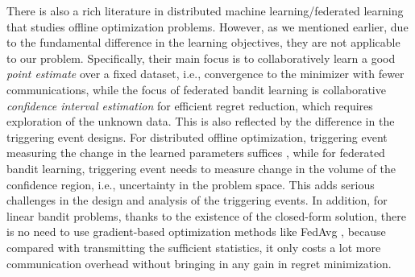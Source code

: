 There is also a rich literature in distributed machine learning/federated learning \citep{mcmahan2017communication,li2019convergence} that studies offline optimization problems. However, as we mentioned earlier, due to the fundamental difference in the learning objectives, they are not applicable to our problem. Specifically, their main focus is to collaboratively learn a good \textit{point estimate} over a fixed dataset, i.e., convergence to the minimizer with fewer communications, while the focus of federated bandit learning is collaborative \textit{confidence interval estimation} for efficient regret reduction, which requires exploration of the unknown data. 
This is also reflected by the difference in the triggering event designs. For distributed offline optimization, triggering event measuring the change in the learned parameters suffices \citep{kia2015distributed,yi2018distributed,george2020distributed}, while for federated bandit learning, triggering event needs to measure change in the volume of the confidence region, i.e., uncertainty in the problem space. This adds serious challenges in the design and analysis of the triggering events. In addition, for linear bandit problems, thanks to the existence of the closed-form solution, there is no need to use gradient-based optimization methods like FedAvg \citep{mcmahan2017communication}, because compared with transmitting the sufficient statistics, it only costs a lot more communication overhead without bringing in any gain in regret minimization.


